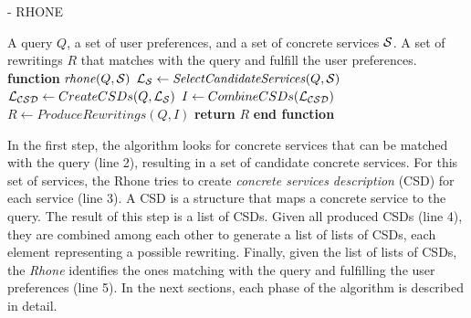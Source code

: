 \begin{algorithm}
\small
\caption{ - RHONE}
\label{algo-rhone}
\begin{algorithmic}[1]
\REQUIRE A query $Q$, a set of user preferences, and a set of concrete services $\hbox{${\cal S}$}$.
\ENSURE A set of rewritings $R$ that matches with the query and fulfill the user preferences.
\STATE \textbf{function} $\mathit{rhone} (Q, \hbox{${\cal S}$})$
 \STATE  $\hbox{${\cal L_{S}}$} \leftarrow \mathit{SelectCandidateServices}(Q, \hbox{${\cal S}$})$ \label{rhone:buildPCD}
 \STATE  $\hbox{${\cal L_{CSD}}$} \leftarrow CreateCSDs(Q, \hbox{${\cal L_{S}}$})$
 \STATE  $I \leftarrow CombineCSDs(\hbox{${\cal L_{CSD}}$})$
 \STATE $R\leftarrow ProduceRewritings(Q, I)$
    \STATE \textbf{return} $R$
\STATE \textbf{end function}
\end{algorithmic}
\end{algorithm}

In the first step, the algorithm looks for concrete services that 
can be matched with the query (line 2), resulting in a set of candidate concrete
services. For this set of services, the Rhone tries to create 
\textit{concrete services description} (CSD) for each service (line 3). 
A CSD is a structure that maps a concrete service to the query. 
The  result of this step is a list of CSDs.
Given all produced CSDs  (line 4), they are combined among each other to generate a list of lists of CSDs, each element representing a possible rewriting.
Finally, given the list of lists of CSDs, the \textit{Rhone} identifies the ones matching with the query and fulfilling the user preferences (line 5).
In the next sections, each phase of the algorithm is described in detail. 

